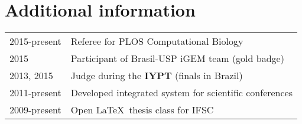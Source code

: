 \documentclass[letterpaper]{resume} %
\begin{document}
\begin{minipage}[t]{0.64\textwidth}
  \sectionspace %


  \section{Additional information}

  \begin{tabular}{ll}
  2015-present & Referee for PLOS Computational Biology \\
  2015 & Participant of Brasil-USP iGEM team (gold badge)\\
  2013, 2015  & Judge during the {\bf IYPT} (finals in Brazil) \\
  2011-present & Developed integrated system for scientific conferences\\
  2009-present & Open \LaTeX \ thesis class for IFSC\\
  \end{tabular}

  \sectionspace %

\end{minipage} %
\end{document}
